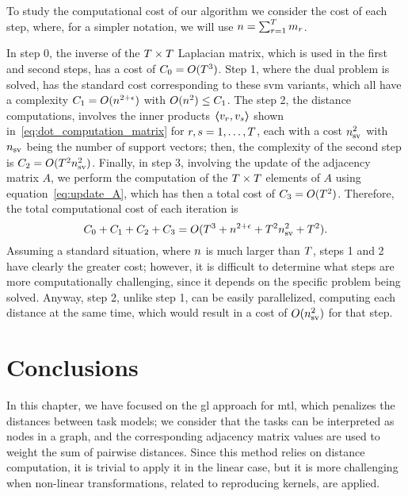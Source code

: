 To study the computational cost of our algorithm we consider the cost of each step, where, for a simpler notation, we will use $n = \sum_{r=1}^T m_r$.

In step 0, the inverse of the $T \times T$ Laplacian matrix, which is used in the first and second steps, has a cost of $C_0 = O(T^3)$.
%
Step 1, where the dual problem is solved, has the standard cost corresponding to these \acrshort{svm} variants, which all have a complexity $C_1 = O(n^{2+\epsilon})$ with $O(n^2) \leq C_1$.
%
The step 2, the distance computations, involves the inner products $\bm{\left\langle} v_r, v_s \bm{\right\rangle}$ shown in~\eqref{eq:dot_computation_matrix} for $r,s=1, \ldots, T$, each with a cost $n_{\text{sv}}^2$ with $n_{\text{sv}}$ being the number of support vectors; then, the complexity of the second step is $C_2 = O(T^2 n_\text{sv}^2)$.
%
Finally, in step 3, involving the update of the adjacency matrix $A$, we perform the computation of the $T \times T$ elements of $A$ using equation~\eqref{eq:update_A}, which has then a total cost of $C_3 = O(T^2)$.
%
Therefore, the total computational cost of each iteration is
$$ C_0 + C_1 + C_2 + C_3 = O(T^3 + n^{2+\epsilon} + T^2 n_\text{sv}^2 + T^2) .$$
%
Assuming a standard situation, where $n$ is much larger than $T$, steps 1 and 2 have clearly the greater cost; however, it is difficult to determine what steps are more computationally challenging, since it depends on the specific problem being solved. Anyway, step 2, unlike step 1, can be easily parallelized, computing each distance at the same time, which would result in a cost of $O(n_\text{sv}^2)$ for that step.




\section{Conclusions}\label{sec:conclusions_5}

In this chapter, we have focused on the \acrshort{gl} approach for \acrshort{mtl}, which penalizes the distances between task models; we consider that the tasks can be interpreted as nodes in a graph, and the corresponding adjacency matrix values are used to weight the sum of pairwise distances.
%
Since this method relies on distance computation, it is trivial to apply it in the linear case, but it is more challenging when non-linear transformations, related to reproducing kernels, are applied.

